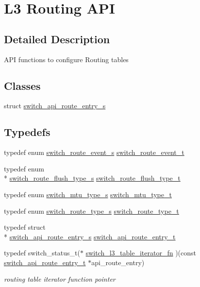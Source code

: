 \hypertarget{group__L3}{\section{L3 Routing A\+P\+I}
\label{group__L3}
}


\subsection{Detailed Description}
A\+P\+I functions to configure Routing tables \subsection*{Classes}
\begin{DoxyCompactItemize}
\item 
struct \hyperlink{structswitch__api__route__entry__s}{switch\+\_\+api\+\_\+route\+\_\+entry\+\_\+s}
\end{DoxyCompactItemize}
\subsection*{Typedefs}
\begin{DoxyCompactItemize}
\item 
typedef enum \hyperlink{group__L3_gaffd4b461af9b6cc9fcfca75ce2fd634f}{switch\+\_\+route\+\_\+event\+\_\+s} \hyperlink{group__L3_ga6c2b46748457866367ca6ac1e1da4667}{switch\+\_\+route\+\_\+event\+\_\+t}
\item 
typedef enum \\*
\hyperlink{group__L3_ga629e27822edfaf923655db4dfb6f2c51}{switch\+\_\+route\+\_\+flush\+\_\+type\+\_\+s} \hyperlink{group__L3_ga5c0e408e2f48ba11ba7e824290d62547}{switch\+\_\+route\+\_\+flush\+\_\+type\+\_\+t}
\item 
typedef enum \hyperlink{group__L3_gae176e30748b79e1948c668298b13f675}{switch\+\_\+mtu\+\_\+type\+\_\+s} \hyperlink{group__L3_gab24f93cedfd57f17218e312ce245638c}{switch\+\_\+mtu\+\_\+type\+\_\+t}
\item 
typedef enum \hyperlink{group__L3_ga27765604c6e2ee42f80f5f5fcb98ec89}{switch\+\_\+route\+\_\+type\+\_\+s} \hyperlink{group__L3_gabfc821b0610bd242ad0a4aba5f152280}{switch\+\_\+route\+\_\+type\+\_\+t}
\item 
typedef struct \\*
\hyperlink{structswitch__api__route__entry__s}{switch\+\_\+api\+\_\+route\+\_\+entry\+\_\+s} \hyperlink{group__L3_ga969f26e2a3436107bc9b6e9f749c79b8}{switch\+\_\+api\+\_\+route\+\_\+entry\+\_\+t}
\item 
typedef switch\+\_\+status\+\_\+t($\ast$ \hyperlink{group__L3_ga0aea3e3c894c8de43078d00eaa9c263d}{switch\+\_\+l3\+\_\+table\+\_\+iterator\+\_\+fn} )(const \hyperlink{group__L3_ga969f26e2a3436107bc9b6e9f749c79b8}{switch\+\_\+api\+\_\+route\+\_\+entry\+\_\+t} $\ast$api\+\_\+route\+\_\+entry)
\begin{DoxyCompactList}\small\item\em routing table iterator function pointer \end{DoxyCompactList}\end{DoxyCompactItemize}
